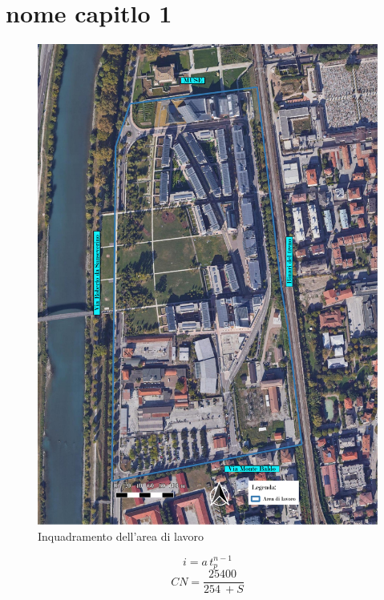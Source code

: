 \chapter{nome capitlo 1}
\begin{figure}[htbp]
    \centering
    \includegraphics[trim=0cm 0cm 0cm 0cm,clip,frame,width=\textwidth]{IMG/inquadramento.pdf} 
    \caption{Inquadramento dell'area di lavoro}
    \label{fig:inquadramento}
    \end{figure}

\begin{equation}
    i = a \, t_p ^{n - 1}
\end{equation}
\begin{equation}
    CN = \frac{\SI{25400}{}}{\SI{254}{} + S}
\end{equation}

